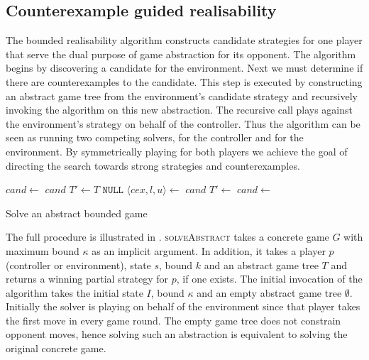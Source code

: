 \subsection{Counterexample guided realisability}

The bounded realisability algorithm constructs candidate strategies for one player that serve the dual purpose of game abstraction for its opponent. The algorithm begins by discovering a candidate for the environment. Next we must determine if there are counterexamples to the candidate. This step is executed by constructing an abstract game tree from the environment's candidate strategy and recursively invoking the algorithm on this new abstraction. The recursive call plays against the environment's strategy on behalf of the controller. Thus the algorithm can be seen as running two competing solvers, for the controller and for the environment. By symmetrically playing for both players we achieve the goal of directing the search towards strong strategies and counterexamples.

\begin{algorithm}
    \begin{algorithmic}[1]
        \State $cand \gets $  \label{line:findcandidate}
         \Return $cand$ \EndIIf {}
        \State $T' \gets T$
        \Loop
             
                \State \Return $\texttt{NULL}$
            \EndIf 
            \State $\langle cex, l, u \rangle \gets $  \label{line:callVerify} 
             
                \State \Return $cand$ 
            \EndIf 
            \State $T' \gets $  
            \State $cand \gets $  
        \EndLoop
        \EndFunction
    \end{algorithmic}
    \caption{Solve an abstract bounded game}
    \label{alg:solveabstract}
\end{algorithm}


The full procedure is illustrated in . \textsc{solveAbstract} takes a concrete game $G$ with maximum bound $\kappa$ as an implicit argument.  In addition, it takes a player $p$ (controller or environment), state $s$, bound $k$ and an abstract game tree $T$ and returns a winning partial strategy for $p$, if one exists.  The initial invocation of the algorithm takes the initial state $I$, bound $\kappa$ and an empty abstract game tree $\emptyset$.  Initially the solver is playing on behalf of the environment since that player takes the first move in every game round.  The empty game tree does not constrain opponent moves, hence solving such an abstraction is equivalent to solving the original concrete game.  

